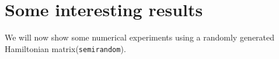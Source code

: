 \chapter{Some interesting results}
We will now show some numerical experiments using a randomly generated Hamiltonian matrix(\texttt{semirandom}).